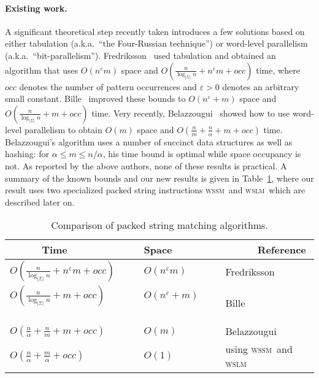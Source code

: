 \documentclass[12pt]{article}
\newcommand{\C}{{\alpha}}
\newcommand{\occ}{{\mathit{occ}}}
\newcommand{\wssm}{\textsc{wssm}}
\newcommand{\wslm}{\textsc{wslm}}
\begin{document}
\paragraph{Existing work.}  A significant theoretical step recently taken introduces a few
solutions based on either tabulation (a.k.a.~``the Four-Russian
technique'') or word-level parallelism (a.k.a.~``bit-parallelism'').  Fredriksson~\cite{fredriksson:2002,fredriksson:2003} used tabulation and obtained an algorithm that uses
$O(n^\varepsilon m)$ space and $O(\frac{n}{\log_{|\Sigma|} n} +
n^\varepsilon m+ \occ)$ time, where $\occ$ denotes the number of
pattern occurrences and $\varepsilon > 0$ denotes an arbitrary  small
constant. Bille~\cite{bille:2011} improved these bounds to
$O(n^\varepsilon + m)$ space and $O(\frac{n}{\log_{|\Sigma|} n} + m+
\occ)$ time. Very recently, Belazzougui~\cite{belazzougui:10} showed
how to use word-level parallelism to obtain $O(m)$ space and $O(\frac{n}{m} + \frac{n}{\C}+m+\occ)$ time. Belazzougui's algorithm uses a number of succinct data structures as well as hashing: for $\C
\leq m \leq n/\C$, his time bound  is optimal
while space occupancy is not. 
As reported by the above authors, 
none of these results is practical.
A summary of the known bounds and our new
results is given in Table~\ref{tab:results}, where our result uses 
two specialized packed string instructions \wssm\ and \wslm\ which are described later on.

\begin{table}[htb]
\begin{center}
   \begin{tabular}{ l l l}
      ~~~~~ Time    & Space& ~~~~~ Reference \\ \hline
      $O(\frac{n}{\log_{|\Sigma|} n} + n^\varepsilon m+ \occ)$ & $O(n^\varepsilon m)$ &        Fredriksson~\cite{fredriksson:2002,fredriksson:2003}\\
      $O(\frac{n}{\log_{|\Sigma|} n} + m + \occ)$ ~~~~~~~   & $O(n^\varepsilon + m)$~~~~~     & Bille~\cite{bille:2011}\\ 
      $O(\frac{n}{\C} + \frac{n}{m} + m + \occ)$   & $O(m)$     &   Belazzougui~\cite{belazzougui:10}\\
      $O(\frac{n}{\C}+\frac{m}{\C}+\occ)$ & $O(1)$ & using \wssm\ and \wslm\ \\
        \end{tabular}
\end{center}
\caption{\label{tab:results}Comparison of packed string matching algorithms.}
\end{table}
\end{document}
